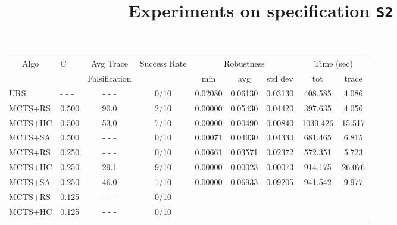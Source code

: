 \documentclass[11pt]{article}
\begin{document}
\begin{table}[ht]
\centering
\title{Experiments on specification \texttt{S2}}
\begin{tabular}{|l|l|c|c|c|c|c|c|c|}
\hline
\multicolumn{1}{|c|}{\multirow{2}{*}{Algo}} & \multirow{2}{*}{C} & Avg Trace               & \multirow{2}{*}{Success Rate} & \multicolumn{3}{c|}{Robustness} & \multicolumn{2}{c|}{Time (sec)} \\ \cline{5-9} 
\multicolumn{1}{|c|}{}                      &                    & Falsification           &                               & min       & avg      & std dev  & tot        & trace        \\ \hline
URS                                         & - - -              & - - -                   & 0/10                          & 0.02080   & 0.06130  & 0.03130  &  408.585   &  4.086       \\ \hline
MCTS+RS                                     & 0.500              &  90.0                   & 2/10                          & 0.00000   & 0.05430  & 0.04420  &  397.635   &  4.056       \\
MCTS+HC                                     & 0.500              &  53.0                   & 7/10                          & 0.00000   & 0.00490  & 0.00840  & 1039.426   & 15.517       \\
MCTS+SA                                     & 0.500              & - - -                   & 0/10                          & 0.00071   & 0.04930  & 0.04330  &  681.465   &  6.815       \\ \hline
MCTS+RS                                     & 0.250              & - - -                   & 0/10                          & 0.00661   & 0.03571  & 0.02372  &  572.351   &  5.723       \\
MCTS+HC                                     & 0.250              &  29.1                   & 9/10                          & 0.00000   & 0.00023  & 0.00073  &  914.175   & 26.076       \\
MCTS+SA                                     & 0.250              &  46.0                   & 1/10                          & 0.00000   & 0.06933  & 0.09205  &  941.542   &  9.977       \\ \hline
MCTS+RS                                     & 0.125              & - - -                   & 0/10                          &           &          &          &            &              \\
MCTS+HC                                     & 0.125              & - - -                   & 0/10                          &           &          &          &            &              \\

\end{tabular}
\end{table}
\end{document}
